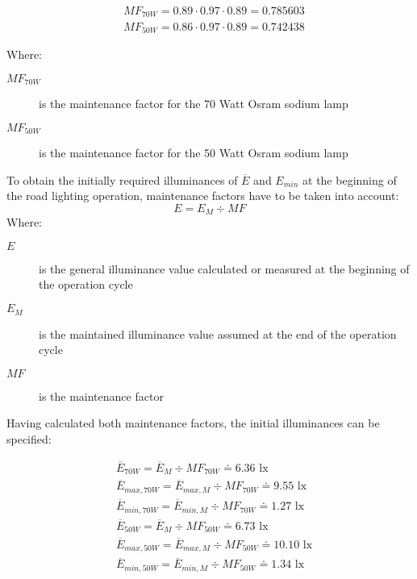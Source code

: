 \begin{align}
&MF_{70W} = 0.89 \cdot 0.97 \cdot 0.89 = 0.785603\\
&MF_{50W} = 0.86 \cdot 0.97 \cdot 0.89 = 0.742438
\end{align}

Where:
\begin{description}
	\item[$MF_{70W}$] is the maintenance factor for the 70 Watt Osram sodium lamp
	\item[$MF_{50W}$] is the maintenance factor for the 50 Watt Osram sodium lamp
\end{description}

To obtain the initially required illuminances of $\overline{E}$ and $E_{min}$ at the beginning of the road lighting operation, maintenance factors have to be taken into account:
\begin{equation}
E = E_{M} \div MF
\end{equation}
Where:
\begin{description}
	\item[$E$] is the general illuminance value calculated or measured at the beginning of the operation cycle
	\item[$E_{M}$] is the maintained illuminance value assumed at the end of the operation cycle
	\item[$MF$] is the maintenance factor
\end{description}

Having calculated both maintenance factors, the initial illuminances can be specified:

\begin{align}
&\overline{E}_{70W} = \overline{E}_{M} \div MF_{70W} \doteq 6.36 \text{ lx}\\
&\overline{E}_{max,70W} = \overline{E}_{max,M} \div MF_{70W} \doteq 9.55 \text{ lx}\\
&\overline{E}_{min,70W} = \overline{E}_{min,M} \div MF_{70W} \doteq 1.27 \text{ lx}\\
&\overline{E}_{50W} = \overline{E}_{M} \div MF_{50W} \doteq 6.73 \text{ lx}\\
&\overline{E}_{max,50W} = \overline{E}_{max,M} \div MF_{50W} \doteq 10.10 \text{ lx}\\
&\overline{E}_{min,50W} = \overline{E}_{min,M} \div MF_{50W} \doteq 1.34 \text{ lx}
\end{align}

